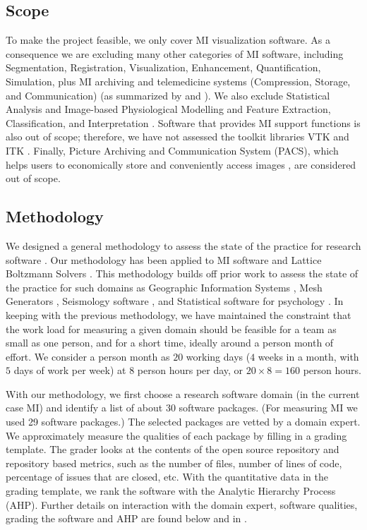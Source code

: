 \documentclass[11pt]{article}
\begin{document}
\subsection{Scope} \label{sec_scope}

To make the project feasible, we only cover MI visualization software.  As a
consequence we are excluding many other categories of MI software, including
Segmentation, Registration, Visualization, Enhancement, Quantification,
Simulation, plus MI archiving and telemedicine systems (Compression, Storage,
and Communication) (as summarized by \citet{Bankman2000} and
\citet{Angenent2006}).  We also exclude Statistical Analysis and Image-based
Physiological Modelling \citep{enwiki:1034877594} and Feature Extraction,
Classification, and Interpretation \citep{Kim2011}. Software that provides MI
support functions is also out of scope; therefore, we have not assessed the
toolkit libraries VTK \citep{SchroederEtAl2006} and ITK \citep{McCormick2014}.
Finally, Picture Archiving and Communication System (PACS), which helps users to
economically store and conveniently access images \citep{Choplin1992}, are
considered out of scope. 

\subsection{Methodology} \label{SecMethodology}

We designed a general methodology to assess the state of the practice for
research software \citep{SmithEtAl2021, SmithAndMichalski2022}.  Our methodology
has been applied to MI software \citep{Dong2021} and Lattice Boltzmann Solvers
\citep{Michalski2021, SmithEtAl2024}.  This methodology builds off prior work to
assess the state of the practice for such domains as Geographic Information
Systems \citep{smith2018state}, Mesh Generators \citep{smith2016state},
Seismology software \citep{Smith2018Seismology}, and Statistical software for
psychology \citep{smith2018statistical}.  In keeping with the previous
methodology, we have maintained the constraint that the work load for measuring
a given domain should be feasible for a team as small as one person, and for a
short time, ideally around a person month of effort. We consider a person month
as $20$ working days ($4$ weeks in a month, with $5$ days of work per week) at
$8$ person hours per day, or $20 \times 8 = 160$ person hours.

With our methodology, we first choose a research software domain (in the current
case MI) and identify a list of about 30 software packages. (For measuring MI we
used 29 software packages.)  The selected packages are vetted by a domain
expert. We approximately measure the qualities of each package by filling in a
grading template. The grader looks at the contents of the open source repository
and repository based metrics, such as the number of files, number of lines of
code, percentage of issues that are closed, etc.  With the quantitative data in
the grading template, we rank the software with the Analytic Hierarchy Process
(AHP). Further details on interaction with the domain expert, software
qualities, grading the software and AHP are found below and in
\citep{SmithEtAl2024_MI_SOP}.
\end{document}
